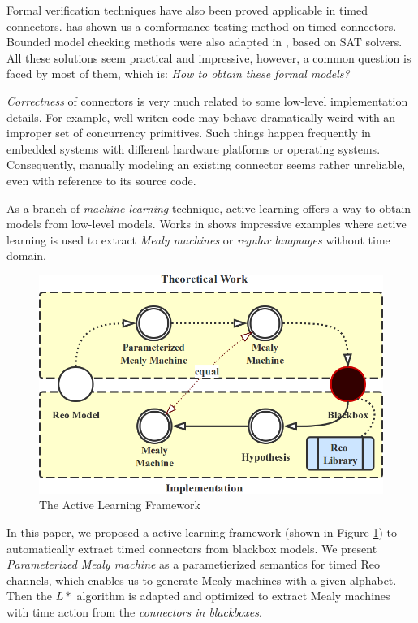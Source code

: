\documentclass[conference, a4paper]{IEEEtran}
\begin{document}
Formal verification techniques have also been proved applicable in timed connectors.
\cite{DBLP:conf/tase/LiCWS15} has shown us a comformance testing method on timed connectors.
Bounded model checking methods were also adapted in \cite{DBLP:journals/scp/Kemper12}, based on SAT
solvers. All these solutions seem practical and impressive, however, a common question is faced by
most of them, which is: \emph{How to obtain these formal models?}

\emph{Correctness} of connectors is very much related to some low-level implementation details.
For example, well-writen code may behave dramatically weird with an improper set of concurrency
primitives. Such things happen frequently in embedded systems with different hardware platforms or
operating systems. Consequently, manually modeling an existing connector seems rather unreliable,
even with reference to its source code.

As a branch of \emph{machine learning} technique, active learning offers a way to obtain models from
low-level models. Works in \cite{DBLP:journals/mt/Daelemans10, DBLP:journals/iandc/Angluin87,
DBLP:conf/fase/RaffeltS06} shows impressive examples where active learning is used to extract
\emph{Mealy machines} or \emph{regular languages} without time domain.

\begin{figure}[ht]
  \begin{center}
    \includegraphics[width=.4\textwidth]{./images/howto.png}
  \end{center}
  \caption{The Active Learning Framework}
  \label{fig:howto}
\end{figure}

In this paper, we proposed a active learning framework (shown in Figure \ref{fig:howto}) to
automatically extract timed connectors from blackbox models. We present \emph{Parameterized Mealy
machine} as a parametierized semantics for timed Reo channels, which enables us to generate Mealy
machines with a given alphabet. Then the $L*$ algorithm is adapted and optimized to extract Mealy
machines with time action from the \emph{connectors in blackboxes}.
\end{document}
